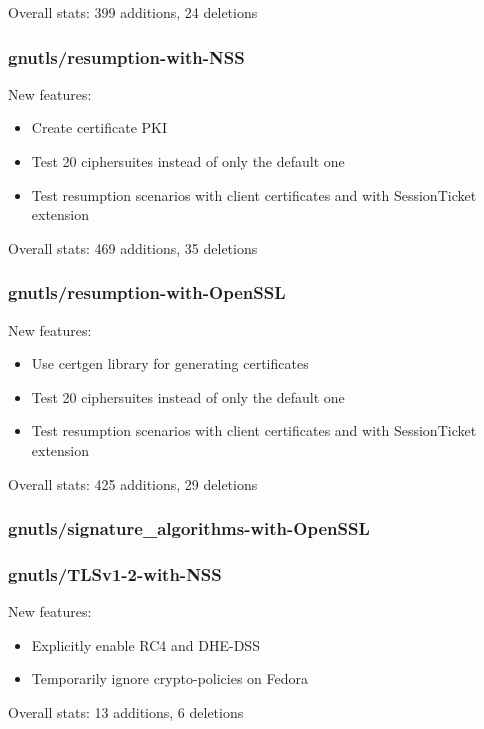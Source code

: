     Overall stats: 399 additions, 24 deletions

\subsubsection{gnutls/resumption-with-NSS}
    New features:
    \begin{itemize}
        \item Create certificate PKI
        \item Test 20 ciphersuites instead of only the default one
        \item Test resumption scenarios with client certificates and with
            SessionTicket extension
    \end{itemize}

    Overall stats: 469 additions, 35 deletions

\subsubsection{gnutls/resumption-with-OpenSSL}
    New features:
    \begin{itemize}
        \item Use certgen library for generating certificates
        \item Test 20 ciphersuites instead of only the default one
        \item Test resumption scenarios with client certificates and with
            SessionTicket extension
    \end{itemize}

    Overall stats: 425 additions, 29 deletions

\subsubsection{gnutls/signature\_algorithms-with-OpenSSL}

\subsubsection{gnutls/TLSv1-2-with-NSS}
    New features:
    \begin{itemize}
        \item Explicitly enable RC4 and DHE-DSS
        \item Temporarily ignore crypto-policies on Fedora
    \end{itemize}

    Overall stats: 13 additions, 6 deletions

